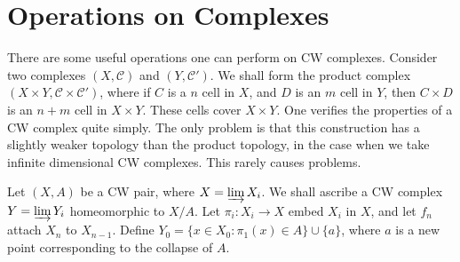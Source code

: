 \section{Operations on Complexes}

There are some useful operations one can perform on CW complexes. Consider two complexes $(X,\mathcal{C})$ and $(Y,\mathcal{C}')$. We shall form the product complex $(X \times Y, \mathcal{C} \times \mathcal{C}')$, where if $C$ is a $n$ cell in $X$, and $D$ is an $m$ cell in $Y$, then $C \times D$ is an $n + m$ cell in $X \times Y$. These cells cover $X \times Y$. One verifies the properties of a CW complex quite simply. The only problem is that this construction has a slightly weaker topology than the product topology, in the case when we take infinite dimensional CW complexes. This rarely causes problems.

Let $(X,A)$ be a CW pair, where $X = \varinjlim X_i$. We shall ascribe a CW complex $Y = \varinjlim Y_i$ homeomorphic to $X/A$. Let $\pi_i: X_i \to X$ embed $X_i$ in $X$, and let $f_n$ attach $X_n$ to $X_{n-1}$. Define $Y_0 = \{ x \in X_0 : \pi_1(x) \in A \} \cup \{ a \}$, where $a$ is a new point corresponding to the collapse of $A$.

